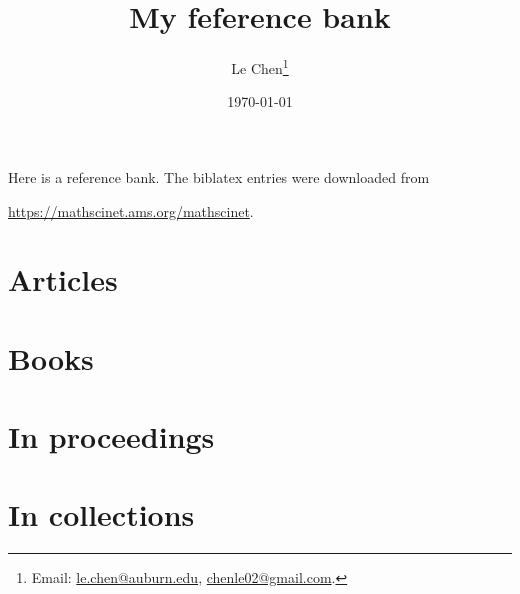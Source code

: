 \documentclass[a4paper,11pt]{article}
\title{My feference bank}
\author{Le Chen\footnote{Email: \url{le.chen@auburn.edu}, \url{chenle02@gmail.com}.}}
\date{\today}
\begin{document}
\maketitle

Here is a reference bank. The biblatex entries were downloaded from

\begin{center}
  \url{https://mathscinet.ams.org/mathscinet}.
\end{center}




\tableofcontents

\citeall

\section{Articles}%
\label{sec:Articles}

\printbibliography[type=article,title={Articles}]
\section{Books}%
\label{sec:Books}

\printbibliography[type=book,title={Books}]

\section{In proceedings}%
\label{sec:In proceedings}

\printbibliography[type=inproceedings,title={In proceedings}]

\section{In collections}%
\label{sec:In collections}

\printbibliography[type=incollection,title={In collection}]

\end{document}
